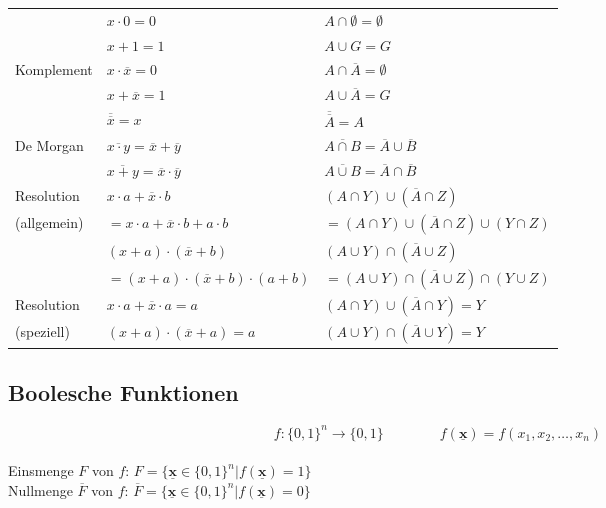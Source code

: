 \documentclass[6pt,a4paper]{scrartcl}
\renewcommand{\vec}[1]{\ensuremath{\underline{\boldsymbol {#1}}}}
\newcommand{\lighthline}{\noalign{\global\arrayrulewidth=0.005pt}\hline\noalign{\global\arrayrulewidth=0.4pt}}
\newcommand{\ra}[0]{\ensuremath{\rightarrow}} 									%
\renewcommand{\vec}[1]{\ensuremath{\underline{\boldsymbol {#1}}}}
\begin{document}
\begin{multicols*}{3}
\begin{tabular}{l|l|l}
			    & $x \cdot 0 = 0$                                       & $A \cap \emptyset = \emptyset$                        \\
		            & $x + 1 = 1$                                           & $A \cup G = G$                                        \\ \lighthline
		Komplement  & $x \cdot \overline{x} = 0$                            & $A \cap \overline{A} = \emptyset$                     \\
		            & $x + \overline{x} = 1$                                & $A \cup \overline{A} = G$                             \\
		            & $\overline{\overline{x}} = x$                         & $\overline{\overline{A}} = A$                         \\ \lighthline
		De Morgan   & $\overline{x \cdot y} = \overline{x} + \overline{y}$  & $\overline{A \cap B} = \overline{A} \cup \overline{B}$\\
		            & $\overline{x + y} = \overline{x} \cdot \overline{y}$ & $\overline{A \cup B} = \overline{A} \cap \overline{B}$\\ \lighthline
		Resolution & $x\cdot a + \overline{x} \cdot b$ & $(A\cap Y) \cup (\overline{A} \cap Z)$\\
		(allgemein) &$= x \cdot a + \overline{x} \cdot b + a \cdot b$ & $= (A \cap Y) \cup (\overline{A} \cap Z) \cup (Y \cap Z)$  \\
		            &  $(x + a) \cdot (\overline{x} + b)$ & $(A \cup Y) \cap (\overline{A} \cup Z)$\\
			 & $= (x + a) \cdot (\overline{x} + b) \cdot (a + b)$ & $= (A \cup Y) \cap (\overline{A} \cup Z) \cap (Y \cup Z)$\\ \lighthline
		Resolution & $x\cdot a + \overline{x} \cdot a = a$ & $(A\cap Y) \cup (\overline{A} \cap Y) = Y$\\
		 (speziell)   &  $(x + a) \cdot (\overline{x} + a) = a$  & $(A \cup Y) \cap (\overline{A} \cup Y) = Y$  
	\end{tabular}


	\subsection{Boolesche Funktionen}	
	\begin{equation*}
	f:\{0,1\}^n\ra \{0,1\} \qquad \qquad f(\vec{x})=f(x_1,x_2,\dots,x_n) 
	\end{equation*} \\
	Einsmenge $F$ von $f$: $F=\{\vec{x}\in \{0,1\}^n|f(\vec{x})=1\}$ \\
	Nullmenge $\overline F$ von $f$: $\overline F=\{\vec{x}\in \{0,1\}^n|f(\vec{x})=0\}$

\end{multicols*}
\end{document}
